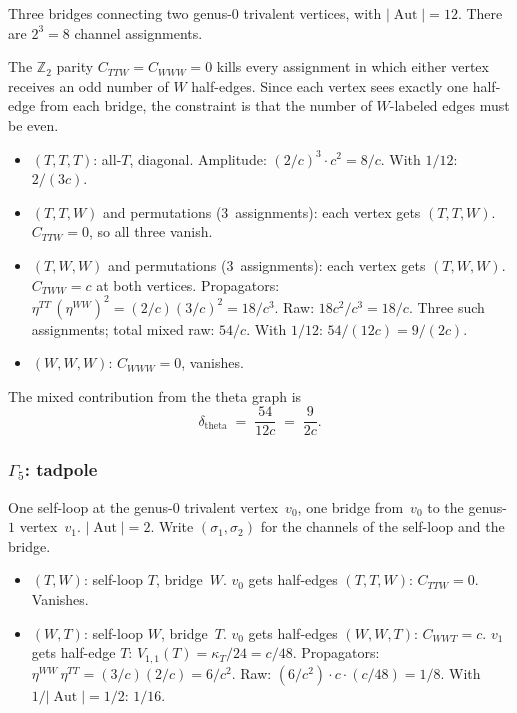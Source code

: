 \documentclass[11pt]{article}
\theoremstyle{plain}
\theoremstyle{definition}
\theoremstyle{remark}
\DeclareMathOperator{\Aut}{Aut}
\begin{document}
Three bridges connecting two genus-$0$ trivalent vertices,
with $|\Aut| = 12$.
There are $2^3 = 8$ channel assignments.

The $\mathbb{Z}_2$ parity $C_{TTW} = C_{WWW} = 0$ kills
every assignment in which either vertex receives an odd number
of $W$ half-edges. Since each vertex sees exactly one
half-edge from each bridge, the constraint is that the number
of $W$-labeled edges must be even.

\begin{itemize}
\item $(T,T,T)$: all-$T$, diagonal.
 Amplitude: $(2/c)^3 \cdot c^2 = 8/c$. With $1/12$:
 $2/(3c)$.

\item $(T,T,W)$ and permutations (3~assignments):
 each vertex gets $(T,T,W)$.
 $C_{TTW} = 0$, so all three vanish.

\item $(T,W,W)$ and permutations (3~assignments):
 each vertex gets $(T,W,W)$.
 $C_{TWW} = c$ at both vertices.
 Propagators: $\eta^{TT}\,(\eta^{WW})^2
 = (2/c)(3/c)^2 = 18/c^3$.
 Raw: $18 c^2/c^3 = 18/c$.
 Three such assignments; total mixed raw: $54/c$.
 With $1/12$: $54/(12c) = 9/(2c)$.

\item $(W,W,W)$: $C_{WWW} = 0$, vanishes.
\end{itemize}

\noindent The mixed contribution from the theta graph is
\begin{equation}\label{eq:theta-cross}
 \delta_{\mathrm{theta}}
 \;=\; \frac{54}{12c}
 \;=\; \frac{9}{2c}.
\end{equation}

\subsubsection*{$\Gamma_5$: tadpole}

One self-loop at the genus-$0$ trivalent vertex~$v_0$,
one bridge from~$v_0$ to the genus-$1$ vertex~$v_1$.
$|\Aut| = 2$.
Write $(\sigma_1, \sigma_2)$ for the channels of the
self-loop and the bridge.

\begin{itemize}
\item $(T,W)$: self-loop $T$, bridge~$W$.
 $v_0$ gets half-edges $(T,T,W)$:
 $C_{TTW} = 0$. Vanishes.

\item $(W,T)$: self-loop $W$, bridge~$T$.
 $v_0$ gets half-edges $(W,W,T)$:
 $C_{WWT} = c$.
 $v_1$ gets half-edge $T$:
 $V_{1,1}(T) = \kappa_T/24 = c/48$.
 Propagators:
 $\eta^{WW}\,\eta^{TT} = (3/c)(2/c) = 6/c^2$.
 Raw: $(6/c^2) \cdot c \cdot (c/48) = 1/8$.
 With $1/|\Aut| = 1/2$:
 $1/16$.
\end{itemize}
\end{document}
